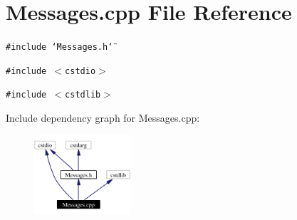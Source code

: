 \section{Messages.cpp File Reference}
\label{Messages_8cpp}
{\tt \#include \char`\"{}Messages.h\char`\"{}}\par
{\tt \#include $<$cstdio$>$}\par
{\tt \#include $<$cstdlib$>$}\par


Include dependency graph for Messages.cpp:\begin{figure}[H]
\begin{center}
\leavevmode
\includegraphics[width=101pt]{Messages_8cpp__incl}
\end{center}
\end{figure}
